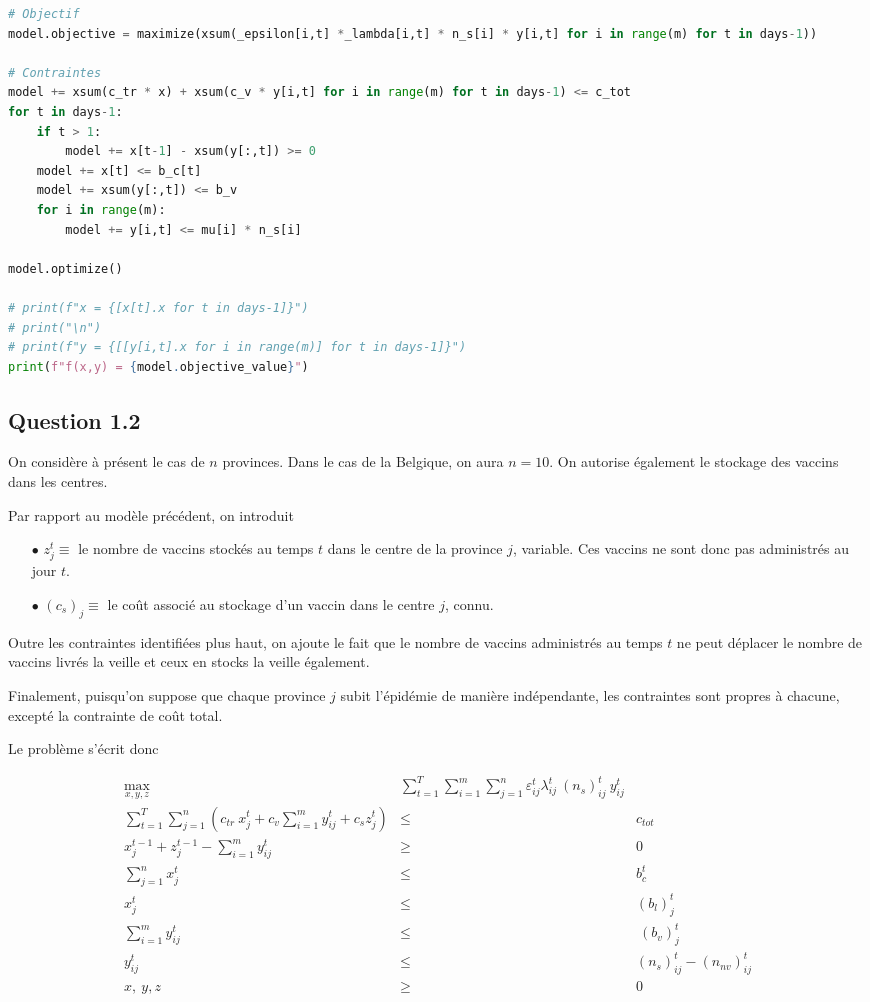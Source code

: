 \documentclass[a4paper,11pt]{report}
\begin{document}
\begin{lstlisting}[language=Python]
# Objectif
model.objective = maximize(xsum(_epsilon[i,t] *_lambda[i,t] * n_s[i] * y[i,t] for i in range(m) for t in days-1))

# Contraintes
model += xsum(c_tr * x) + xsum(c_v * y[i,t] for i in range(m) for t in days-1) <= c_tot
for t in days-1:
    if t > 1: 
        model += x[t-1] - xsum(y[:,t]) >= 0
    model += x[t] <= b_c[t]
    model += xsum(y[:,t]) <= b_v
    for i in range(m):
        model += y[i,t] <= mu[i] * n_s[i]

model.optimize()

# print(f"x = {[x[t].x for t in days-1]}")
# print("\n")
# print(f"y = {[[y[i,t].x for i in range(m)] for t in days-1]}")
print(f"f(x,y) = {model.objective_value}")

\end{lstlisting}

\subsection{Question 1.2}
On considère à présent le cas de $n$ provinces. Dans le cas de la Belgique, on aura $n=10$.
On autorise également le stockage des vaccins dans les centres.

Par rapport au modèle précédent, on introduit 
\begin{itemize}
\item[$\bullet$] $z_j^t \equiv$ le nombre de vaccins stockés au temps $t$ dans le centre de la province $j$, variable. Ces vaccins ne sont donc pas administrés au jour $t$.
\item[$\bullet$] $(c_s)_j \equiv$ le coût associé au stockage d'un vaccin dans le centre $j$, connu.
\end{itemize}


Outre les contraintes identifiées plus haut, on ajoute le fait que le nombre de vaccins administrés au temps $t$ ne peut déplacer le nombre de vaccins livrés la veille et ceux en stocks la veille également.

Finalement, puisqu'on suppose que chaque province $j$ subit l'épidémie de manière indépendante, les contraintes sont propres à chacune, excepté la contrainte de coût total.

Le problème s'écrit donc

\begin{eqnarray*}
\max_{x, y, z}& \sum_{t=1}^{T} \sum_{i=1}^{m} \sum_{j=1}^{n} \varepsilon_{ij}^t \lambda_{ij}^t\ (n_s)_{ij}^t\ y_{ij}^t \\
\sum_{t=1}^T \sum_{j=1}^{n} \left(c_{tr}\ x_j^t + c_v \sum_{i=1}^{m} y_{ij}^t + c_s z_j^t\right) &\leq& c_{tot} \\
x_j^{t-1} + z_j^{t-1} - \sum_{i=1}^{m} y_{ij}^t &\geq& 0 \\
\sum_{j=1}^n x_j^{t} &\leq & b_c^t \\ 
x_j^t &\leq& (b_l)_j^t \\
\sum_{i=1}^{m} y_{ij}^t &\leq&\ (b_v)_j^t \\
y_{ij}^t &\leq& (n_s)_{ij}^t - (n_{nv})_{ij}^t \\
x,\ y, z &\geq& 0
\end{eqnarray*}
\end{document}
